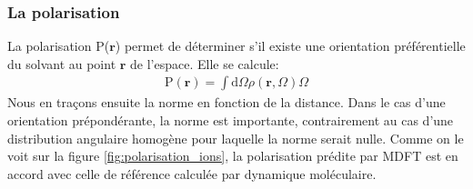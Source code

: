 \subsubsection{La polarisation}
La polarisation P($\boldsymbol{r}$) permet de déterminer s'il existe une orientation préférentielle du solvant au point $\boldsymbol{r}$ de l'espace. Elle se calcule:
\begin{eqnarray}
\mathrm{P}(\boldsymbol{r})=\int\mathrm{d}\Omega\rho\left(\boldsymbol{r},\Omega \right)\Omega
\end{eqnarray}
Nous en traçons ensuite la norme en fonction de la distance. Dans le cas d'une orientation prépondérante, la norme est importante, contrairement au cas d'une distribution angulaire homogène pour laquelle la norme serait nulle.
Comme on le voit sur la figure \ref{fig:polarisation_ions}, la polarisation prédite par MDFT est en accord avec celle de référence calculée par dynamique moléculaire.


